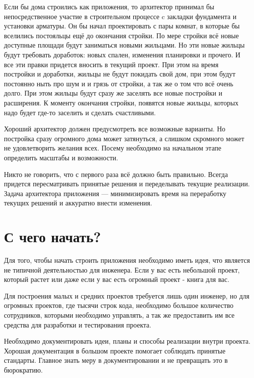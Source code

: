 
Если бы дома строились как приложения, то архитектор принимал бы непосредственное участие в строительном процессе c закладки фундамента и установки арматуры.  Он бы начал проектировать с пары комнат, в которые бы вселились постояльцы ещё до окончания стройки. По мере стройки всё новые доступные площади будут заниматься новыми жильцами. Но эти новые жильцы будут требовать доработок: новых спален, изменения планировки и прочего. И все эти правки придется вносить в текущий проект. При этом на время постройки и доработки, жильцы не будут покидать свой дом, при этом будут постоянно ныть про шум и и грязь от стройки, а так же о том что всё очень долго. При этом жильцы будут сразу же заселять все новые постройки и расширения. К моменту окончания стройки, появятся новые жильцы, которых надо будет где-то заселить и сделать счастливыми.

Хороший архитектор должен предусмотреть все возможные варианты. Но постройка сразу огромного дома может затянуться, а слишком скромного может не удовлетворить желания всех. Посему необходимо на начальном этапе определить масштабы и возможности.

Никто не говорить, что с первого раза всё должно быть правильно. Всегда придется пересматривать принятые решения и переделывать текущие реализации. Задача архитектора приложения --- минимизировать время на переработку текущих решений и аккуратно внести изменения.

\section{С чего начать?} \label{sect1_3}

Для того, чтобы начать строить приложения необходимо иметь идея, что является не типичной деятельностью для инженера. Если у вас есть небольшой проект, который растет или даже если у вас есть огромный проект - книга для вас.

Для построения малых и средних проектов требуется лишь один инженер, но для огромных проектов, где тысячи строк кода, необходимо большое количество сотрудников, которыми необходимо управлять, а так же предоставить им все средства для разработки и тестирования проекта. 


Необходимо документировать идеи, планы и способы реализации внутри проекта. Хорошая документация в большом проекте помогает соблюдать принятые стандарты. Главное знать меру в документировании и не превращать это в бюрократию.

